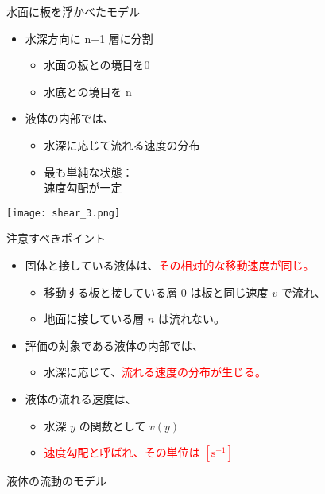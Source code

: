 \documentclass[uplatex,dvipdfmx,a4paper,11pt]{jsreport}
\begin{document}
\begin{figure}[htb]
	\begin{center}
		\begin{minipage}{0.45\textwidth}
			\begin{itembox}[l]{水面に板を浮かべたモデル}
				\begin{itemize}
					\item 水深方向に n+1 層に分割
						\begin{itemize}
							\item 水面の板との境目を0
							\item 水底との境目を n 
						\end{itemize}
						\item 液体の内部では、
						\begin{itemize}
							\item 水深に応じて流れる速度の分布
							\item 最も単純な状態：\\速度勾配が一定
						\end{itemize}
				\end{itemize}
			\end{itembox}
		\end{minipage}
		\begin{minipage}{0.45\textwidth}
			\begin{center}
			\texttt{[image: shear\_3.png]}
			\end{center}
		\end{minipage}
		\begin{minipage}{0.9\textwidth}
			\begin{center}
			\begin{itembox}[l]{注意すべきポイント}
				\begin{itemize}
					\item 固体と接している液体は、\textcolor{red}{その相対的な移動速度が同じ。}
					\begin{itemize}
						\item 移動する板と接している層 0 は板と同じ速度 $v$ で流れ、
						\item 地面に接している層 $n$ は流れない。
					\end{itemize}
					\item 評価の対象である液体の内部では、
					\begin{itemize}
						\item 水深に応じて、\textcolor{red}{流れる速度の分布が生じる。}
					\end{itemize}
					\item 液体の流れる速度は、
					\begin{itemize}
						\item 水深 $y$ の関数として $v(y)$
						\item \textcolor{red}{速度勾配と呼ばれ、その単位は $[\mathrm{s^{-1}}]$}
					\end{itemize}
				\end{itemize}
			\end{itembox}
			\end{center}
		\end{minipage}
		\caption{液体の流動のモデル}
		\label{fig:ryudo_model}
	\end{center}
\end{figure}
\end{document}
